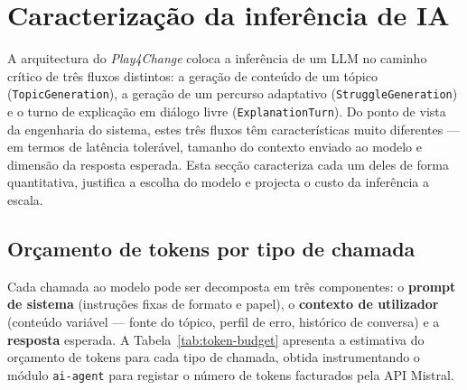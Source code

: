 %
%
%
%   
%
\section{Caracterização da inferência de IA}
\label{sec:inferencia-ia}

A arquitectura do \emph{Play4Change} coloca a inferência de um LLM no caminho crítico de três fluxos distintos: a geração de conteúdo de um tópico (\texttt{TopicGeneration}), a geração de um percurso adaptativo (\texttt{StruggleGeneration}) e o turno de explicação em diálogo livre (\texttt{ExplanationTurn}). Do ponto de vista da engenharia do sistema, estes três fluxos têm características muito diferentes --- em termos de latência tolerável, tamanho do contexto enviado ao modelo e dimensão da resposta esperada. Esta secção caracteriza cada um deles de forma quantitativa, justifica a escolha do modelo e projecta o custo da inferência a escala.

\subsection{Orçamento de tokens por tipo de chamada}
\label{ssec:token-budget}

Cada chamada ao modelo pode ser decomposta em três componentes: o \textbf{prompt de sistema} (instruções fixas de formato e papel), o \textbf{contexto de utilizador} (conteúdo variável --- fonte do tópico, perfil de erro, histórico de conversa) e a \textbf{resposta} esperada. A Tabela~\ref{tab:token-budget} apresenta a estimativa do orçamento de tokens para cada tipo de chamada, obtida instrumentando o módulo \texttt{ai-agent} para registar o número de tokens facturados pela API Mistral.

